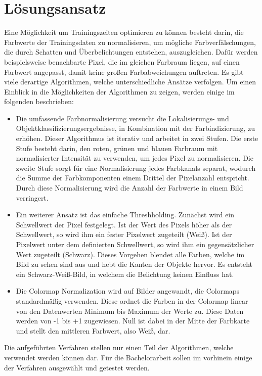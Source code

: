 \documentclass[a4paper,12pt,oneside]{article}
\begin{document}
  \section{Lösungsansatz}
  Eine Möglichkeit um Trainingszeiten optimieren zu können besteht darin, die Farbwerte 
  der Trainingsdaten zu normalisieren, um mögliche Farbverfälschungen, die durch Schatten und 
  Überbelichtungen entstehen, auszugleichen. Dafür werden beispielsweise benachbarte Pixel, 
  die im gleichen Farbraum liegen, auf einen Farbwert angepasst, damit keine großen 
  Farbabweichungen auftreten. Es gibt viele derartige Algorithmen, welche unterschiedliche 
  Ansätze verfolgen. Um einen Einblick in die Möglichkeiten der Algorithmen zu zeigen, werden 
  einige im folgenden beschrieben:\vspace{1 cm}
  \begin{itemize}
  \item Die umfassende Farbnormalisierung versucht die Lokalisierungs- und 
  Objektklassifizierungsergebnisse, in Kombination mit der Farbindizierung, zu erhöhen. Dieser 
  Algorithmus ist iterativ und arbeitet in zwei Stufen. Die erste Stufe besteht darin, den 
  roten, grünen und blauen Farbraum mit normalisierter Intensität zu verwenden, um jedes Pixel 
  zu normalisieren. Die zweite Stufe sorgt für eine Normalisierung jedes Farbkanals separat, 
  wodurch die Summe der Farbkomponenten einem Drittel der Pixelanzahl entspricht. Durch diese 
  Normalisierung wird die Anzahl der Farbwerte in einem Bild verringert.
  \item Ein weiterer Ansatz ist das einfache Threshholding. Zunächst wird ein Schwellwert der 
  Pixel festgelegt. Ist der Wert des Pixels höher als der Schwellwert, so wird ihm ein fester 
  Pixelwert zugeteilt (Weiß). Ist der Pixelwert unter dem definierten Schwellwert, so wird ihm ein 
  gegensätzlicher Wert zugeteilt (Schwarz). Dieses Vorgehen blendet alle Farben, welche im Bild zu 
  sehen sind aus und hebt die Kanten der Objekte hervor. Es entsteht ein Schwarz-Weiß-Bild, in 
  welchem die Belichtung keinen Einfluss hat.
  \item Die Colormap Normalization wird auf Bilder angewandt, die Colormaps standardmäßig 
  verwenden. Diese ordnet die Farben in der Colormap linear von den Datenwerten Minimum bis 
  Maximum der Werte zu. Diese Daten werden von -1 bis +1 zugewiesen. Null ist dabei in der Mitte 
  der Farbkarte und stellt den mittleren Farbwert, also Weiß, dar.
  \end{itemize}   
  Die aufgeführten Verfahren stellen nur einen Teil der Algorithmen, welche verwendet werden 
  können dar. Für die Bachelorarbeit sollen im vorhinein einige der Verfahren ausgewählt und 
  getestet werden.\vspace{1 cm}
\end{document}
